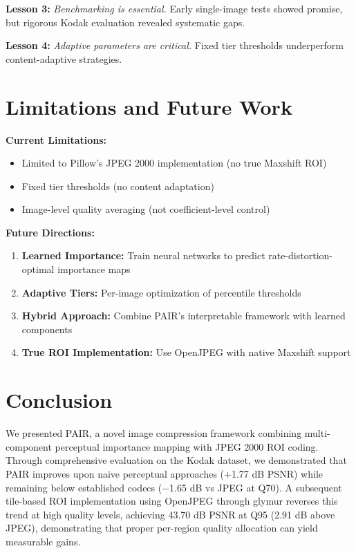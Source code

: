 \documentclass[conference]{IEEEtran}
\begin{document}
\textbf{Lesson 3:} \textit{Benchmarking is essential.} Early single-image tests showed promise, but rigorous Kodak evaluation revealed systematic gaps.

\textbf{Lesson 4:} \textit{Adaptive parameters are critical.} Fixed tier thresholds underperform content-adaptive strategies.

\section{Limitations and Future Work}

\textbf{Current Limitations:}
\begin{itemize}
    \item Limited to Pillow's JPEG 2000 implementation (no true Maxshift ROI)
    \item Fixed tier thresholds (no content adaptation)
    \item Image-level quality averaging (not coefficient-level control)
\end{itemize}

\textbf{Future Directions:}
\begin{enumerate}
    \item \textbf{Learned Importance:} Train neural networks to predict rate-distortion-optimal importance maps
    \item \textbf{Adaptive Tiers:} Per-image optimization of percentile thresholds
    \item \textbf{Hybrid Approach:} Combine PAIR's interpretable framework with learned components
    \item \textbf{True ROI Implementation:} Use OpenJPEG with native Maxshift support
\end{enumerate}

\section{Conclusion}

We presented PAIR, a novel image compression framework combining multi-component perceptual importance mapping with JPEG 2000 ROI coding. Through comprehensive evaluation on the Kodak dataset, we demonstrated that PAIR improves upon naive perceptual approaches (+1.77 dB PSNR) while remaining below established codecs ($-$1.65 dB vs JPEG at Q70). A subsequent tile-based ROI implementation using OpenJPEG through glymur reverses this trend at high quality levels, achieving 43.70 dB PSNR at Q95 (2.91 dB above JPEG), demonstrating that proper per-region quality allocation can yield measurable gains.
\end{document}
